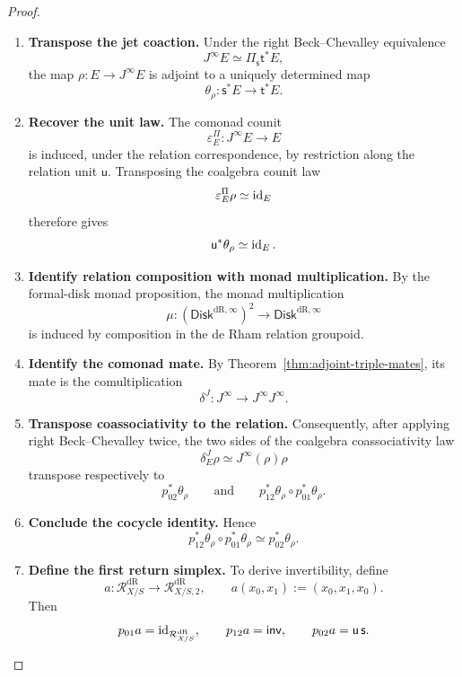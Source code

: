 \begin{proof}
\leavevmode
\begin{enumerate}[label=\textup{(\arabic*)}]
    \item \textbf{Transpose the jet coaction.}
Under the right Beck--Chevalley equivalence
\[
  J^\infty E
  \simeq
  \Pi_{\mathsf s}\mathsf t^*E,
\]
the map \(\rho:E\to J^\infty E\) is adjoint to a uniquely determined map
\[
  \theta_\rho:\mathsf s^*E\to \mathsf t^*E.
\]

    \item \textbf{Recover the unit law.}
The comonad counit
\[
  \varepsilon^\Pi_E:J^\infty E\to E
\]
is induced, under the relation correspondence, by restriction along the
relation unit \(\mathsf u\). Transposing the coalgebra counit law
\[
  \varepsilon^\Pi_E\rho\simeq\operatorname{id}_E
\]
therefore gives
\[
  \mathsf u^*\theta_\rho\simeq\operatorname{id}_E.
\]

    \item \textbf{Identify relation composition with monad multiplication.}
By the formal-disk monad proposition, the monad multiplication
\[
  \mu:(\mathsf{Disk}^{\mathrm{dR},\infty})^2\to \mathsf{Disk}^{\mathrm{dR},\infty}
\]
is induced by composition in the de Rham relation groupoid.

    \item \textbf{Identify the comonad mate.}
By
Theorem~\ref{thm:adjoint-triple-mates}, its mate is the comultiplication
\[
  \delta^J:J^\infty\to J^\infty J^\infty.
\]

    \item \textbf{Transpose coassociativity to the relation.}
Consequently, after applying right Beck--Chevalley twice, the two sides of the
coalgebra coassociativity law
\[
  \delta^J_E\rho
  \simeq
  J^\infty(\rho)\rho
\]
transpose respectively to
\[
  p_{02}^*\theta_\rho
  \qquad\text{and}\qquad
  p_{12}^*\theta_\rho\circ p_{01}^*\theta_\rho.
\]

    \item \textbf{Conclude the cocycle identity.}
Hence
\[
  p_{12}^*\theta_\rho\circ p_{01}^*\theta_\rho
  \simeq
  p_{02}^*\theta_\rho.
\]

    \item \textbf{Define the first return simplex.}
To derive invertibility, define
\[
  a:\mathcal R^{\mathrm{dR}}_{X/S}\to \mathcal R^{\mathrm{dR}}_{X/S,2},
  \qquad
  a(x_0,x_1):=(x_0,x_1,x_0).
\]
Then
\[
  p_{01}a=\operatorname{id}_{\mathcal R^{\mathrm{dR}}_{X/S}},
  \qquad
  p_{12}a=\mathsf{inv},
  \qquad
  p_{02}a=\mathsf u\,\mathsf s.
\]


\end{enumerate}
\end{proof}
